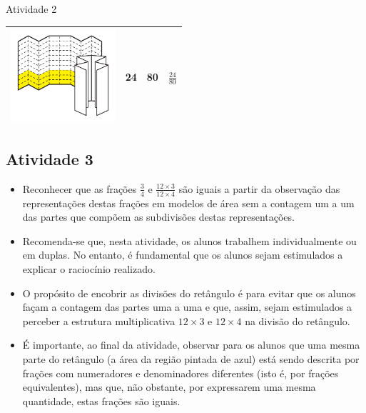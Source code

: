\begin{resposta*}{Atividade 2}
\begin{tabular}{|m{}|m{}|m{}|m{}|}
      \hline 
      \includegraphics[width=110pt, keepaspectratio]{../media/cap4/secoes/pngs/ativ2_fig06.png}&  24 &  80 &  $\frac{24}{80}$ \\
      \hline 
    \end{tabular}
  
\end{resposta*}

\Bg

\begin{multicols}{2}
\subsection{Atividade 3}


\begin{itemize} %
    \item       Reconhecer que as frações       $\frac{3}{4}$       e       
$\frac{12 \times 3}{12 \times 4}$       são iguais a partir da observação das 
representações destas frações em modelos de área sem a contagem um a um das 
partes que compõem as subdivisões destas representações.
\end{itemize} %
  
  
 
\begin{itemize} %
    \item       Recomenda-se que, nesta atividade, os alunos trabalhem 
individualmente ou em duplas. No entanto, é fundamental que os alunos sejam 
estimulados a explicar o raciocínio realizado.
    \item       O propósito de encobrir as divisões do retângulo é para evitar 
que os alunos façam a contagem das partes uma a uma e que, assim, sejam 
estimulados a perceber a estrutura multiplicativa       $12 \times 3$       e    
   $12 \times 4$       na divisão do retângulo.
    \item       É importante, ao final da atividade, observar para os alunos que 
uma mesma parte do retângulo (a área da região pintada de azul) está sendo 
descrita por frações com numeradores e denominadores diferentes (isto é, por 
frações equivalentes), mas que, não obstante, por expressarem uma mesma 
quantidade, estas frações são iguais. 
\end{itemize} %
  

\end{multicols}
